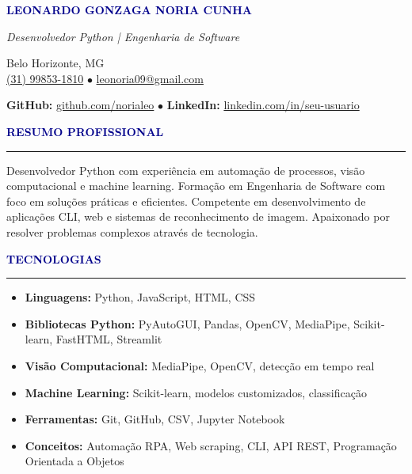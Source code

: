 \documentclass[11pt]{article}
\newcommand{\sectiontitle}[1]{
    \vspace{0.3cm}
    {\large \textbf{\textcolor{darkblue}{#1}}}
    \vspace{0.1cm}
    \hrule
    \vspace{0.2cm}
}
\begin{document}
\begin{center}
    {\LARGE \textbf{\textcolor{darkblue}{LEONARDO GONZAGA NORIA CUNHA}}}
    
    \vspace{0.15cm}
    
    \textit{Desenvolvedor Python | Engenharia de Software}
    
    \vspace{0.2cm}
    
    Belo Horizonte, MG \\
    \href{tel:+5531998531810}{(31) 99853-1810} $\bullet$ \href{mailto:leonoria09@gmail.com}{leonoria09@gmail.com}
    
    \vspace{0.1cm}
    
    \textbf{GitHub:} \href{https://github.com/norialeo}{github.com/norialeo} $\bullet$ 
    \textbf{LinkedIn:} \href{https://linkedin.com/in/seu-usuario}{linkedin.com/in/seu-usuario}
    
\end{center}

\vspace{0.3cm}

\sectiontitle{RESUMO PROFISSIONAL}

Desenvolvedor Python com experiência em automação de processos, visão computacional e machine learning. Formação em Engenharia de Software com foco em soluções práticas e eficientes. Competente em desenvolvimento de aplicações CLI, web e sistemas de reconhecimento de imagem. Apaixonado por resolver problemas complexos através de tecnologia.

\sectiontitle{TECNOLOGIAS}

\begin{itemize}[leftmargin=1.5cm, itemsep=0.08cm]
    \item \textbf{Linguagens:} Python, JavaScript, HTML, CSS
    \item \textbf{Bibliotecas Python:} PyAutoGUI, Pandas, OpenCV, MediaPipe, Scikit-learn, FastHTML, Streamlit
    \item \textbf{Visão Computacional:} MediaPipe, OpenCV, detecção em tempo real
    \item \textbf{Machine Learning:} Scikit-learn, modelos customizados, classificação
    \item \textbf{Ferramentas:} Git, GitHub, CSV, Jupyter Notebook
    \item \textbf{Conceitos:} Automação RPA, Web scraping, CLI, API REST, Programação Orientada a Objetos
\end{itemize}
\end{document}
